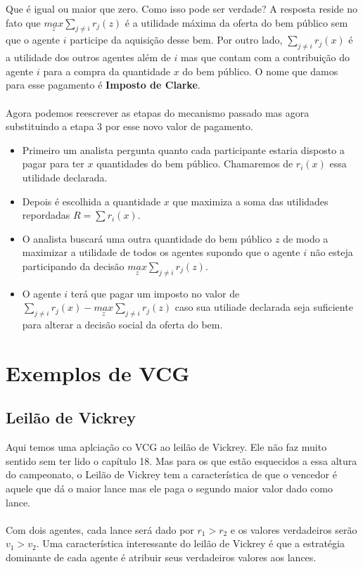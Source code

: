 \documentclass[a4paper,11pt,oneside]{book}
\theoremstyle{definition}
\theoremstyle{break}
\begin{document}
Que é igual ou maior que zero. Como isso pode ser verdade? A resposta reside no fato que $\underset{z}{max} \sum_{j \neq i} r_j(z)$ é a utilidade máxima da oferta do bem público sem que o agente $i$ participe da aquisição desse bem. Por outro lado, $\sum_{j \neq i} r_j(x)$ é a utilidade dos outros agentes além de $i$ mas que contam com a contribuição do agente $i$ para a compra da quantidade $x$ do bem público. O nome que damos para esse pagamento é \textbf{Imposto de Clarke}.
\\~\\
Agora podemos reescrever as etapas do mecanismo passado mas agora substituindo a etapa 3 por esse novo valor de pagamento.

\begin{itemize}
	\item Primeiro um analista pergunta quanto cada participante estaria disposto a pagar para ter $x$ quantidades do bem público. Chamaremos de $r_i(x)$ essa utilidade declarada.
	\item Depois é escolhida a quantidade $x$ que maximiza a soma das utilidades repordadas $R = \sum r_i(x)$.
	\item O analista buscará uma outra quantidade do bem público $z$ de modo a maximizar a utilidade de todos os agentes supondo que o agente $i$ não esteja participando da decisão $\underset{z}{max} \sum_{j \neq i} r_j(z)$.
	\item O agente $i$ terá que pagar um imposto no valor de $ \displaystyle \sum_{j \neq i} r_j(x) - \underset{z}{max} \sum_{j \neq i} r_j(z) $ caso sua utiliade declarada seja suficiente para alterar a decisão social da oferta do bem.
\end{itemize}

\section{Exemplos de VCG}

\subsection{Leilão de Vickrey}
Aqui temos uma aplciação co VCG ao leilão de Vickrey. Ele não faz muito sentido sem ter lido o capítulo 18. Mas para os que estão esquecidos a essa altura do campeonato, o Leilão de Vickrey tem a característica de que o vencedor é aquele que dá o maior lance mas ele paga o segundo maior valor dado como lance.
\\~\\
Com dois agentes, cada lance será dado por $r_1 > r_2$ e os valores verdadeiros serão $v_1 > v_2$. Uma característica interessante do leilão de Vickrey é que a estratégia dominante de cada agente é atribuir seus verdadeiros valores aos lances.
\end{document}
